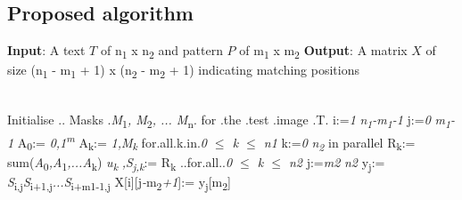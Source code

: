 \documentclass[graybox]{svmult}
\begin{document}
\subsection{Proposed algorithm}
\label{subsec:1}

\textbf{Input}: A text $T$ of n\textsubscript{1} x n\textsubscript{2} and pattern $P$ of m\textsubscript{1} x m\textsubscript{2} \newline
\textbf{Output}: A matrix $X$ of size (n\textsubscript{1} - m\textsubscript{1} + 1) x (n\textsubscript{2} - m\textsubscript{2} + 1) indicating matching positions

\begin{program}
\BEGIN \\ %
	Initialise .. Masks .\textsl{M}\textsubscript{1}\textsl{, M}\textsubscript{2}\textsl{, ... M}\textsubscript{n}. for .the .test .image .T.
  \FOR i:=\textsl{1} \TO \textsl{n\textsubscript{1}-m\textsubscript{1}-1} \DO
  	\FOR j:=\textsl{0} \TO \textsl{m\textsubscript{1}-1} \DO
  	A\textsubscript{0}:= \langle \textsl{0,1}\textsuperscript{\textsl{m}} \rangle
  	A\textsubscript{k}:= \langle \textsl{1,M}\textsubscript{\textsl{k}} \rangle for.all.k.in.\textsl{0 $\leq$ k $\leq$ n1}
  		\FOR k:=\textsl{0} \TO \textsl{n\textsubscript{2}} \DO in parallel
  			R\textsubscript{k}:= sum(\textsl{A}\textsubscript{0}\textsl{,A}\textsubscript{1}\textsl{,...A}\textsubscript{k}) 
  		\END
  		\langle \textsl{u}\textsubscript{\textsl{k}} \textsl{,S}\textsubscript{\textsl{j,k}}\rangle:= R\textsubscript{k} ..for.all..\textsl{0 $\leq$ k $\leq$ n2}
  	\END
  	\FOR j:=\textsl{m2} \TO \textsl{n2} \DO
  		y\textsubscript{j}:= \textsl{S}\textsubscript{i,j}\vert\textsl{S}\textsubscript{i+1,j}\vert\textsl{...}\vert\textsl{S}\textsubscript{i+m1-1,j} 
  		X[i][j\textsl{-}m\textsubscript{2}\textsl{+1}]:= y\textsubscript{j}[m\textsubscript{2}]
 	\END
 \END
\END
\end{program}
\end{document}
